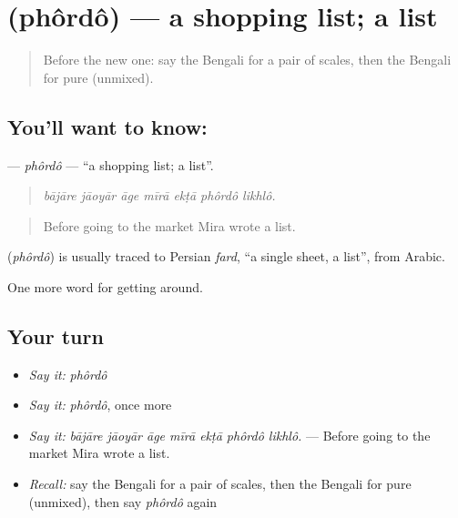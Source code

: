 \section[\texorpdfstring{\bn{ফর্দ} (phôrdô)}{ফর্দ (phôrdô)}]{ (phôrdô) — a shopping list; a list}

\label{lesson:BN-C422-phordo}



\begin{quote}
Before the new one: say the Bengali for a pair of scales, then the Bengali for pure (unmixed).
\end{quote}

\subsection*{You'll want to know: }
\textbf{} — \emph{phôrdô} — \textquotedblleft{}a shopping list; a list\textquotedblright{}.

\begin{quote}
      
\end{quote}

\begin{quote}
\emph{bājāre jāoyār āge mīrā ekṭā phôrdô likhlô.}
\end{quote}

\begin{quote}
Before going to the market Mira wrote a list.
\end{quote}

\begin{cousinweb}
\textbf{} (\emph{phôrdô}) is usually traced to Persian \emph{fard}, \textquotedblleft{}a single sheet, a list\textquotedblright{}, from Arabic.
\end{cousinweb}

\begin{grammarlens}[title={What you've built}]
One more word for getting around.
\end{grammarlens}

\subsection*{Your turn}
\begin{itemize}
\raggedright
  \item \emph{Say it:} \emph{phôrdô}
  \item \emph{Say it:} \emph{phôrdô}, once more
  \item \emph{Say it:} \emph{bājāre jāoyār āge mīrā ekṭā phôrdô likhlô.} — Before going to the market Mira wrote a list.
  \item \emph{Recall:} say the Bengali for a pair of scales, then the Bengali for pure (unmixed), then say \emph{phôrdô} again
\end{itemize}

